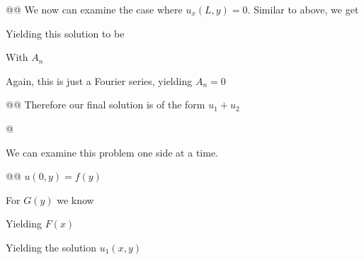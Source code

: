 \documentclass[10pt]{article}
\begin{document}
\begin{easylist}[enumerate]
    @@ We now can examine the case where $u_x(L, y) = 0$. Similar to above, we get


    Yielding this solution to be


    With $A_n$


    Again, this is just a Fourier series, yielding $A_n = 0$

    @@ Therefore our final solution is of the form $u_1 + u_2$


    @ 

    We can examine this problem one side at a time.

    @@ $u(0, y) = f(y)$

    For $G(y)$ we know


    Yielding $F(x)$


    Yielding the solution $u_1(x, y)$



\end{easylist}
\end{document}

